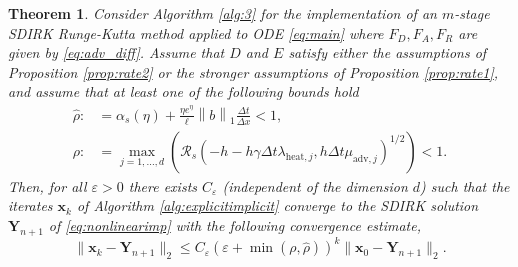 \documentclass[10pt,a4paper]{article}
\newtheorem{theorem}{Theorem}[section]
\renewcommand{\epsilon}{\varepsilon}
\newcommand{\norm}[1]{\left\lVert #1 \right\rVert}
\begin{document}
\begin{theorem}\label{thm:ad}
Consider Algorithm \ref{alg:3} for the implementation of an $m$-stage SDIRK Runge-Kutta method applied to ODE \eqref{eq:main} where $F_{D},F_{A},F_{R}$ are given by \eqref{eq:adv_diff}. Assume that $D$ and $E$ satisfy either the assumptions of Proposition \ref{prop:rate2} or the stronger assumptions of Proposition \ref{prop:rate1}, and
{assume that at least one of the following bounds hold}
{\begin{align*}
\hat \rho:&= \alpha_s(\eta)+ \frac{\eta e^\eta}{\ell}\norm{b}_{1}\frac{\Delta t}{\Delta x}<1,
 \\
\rho:&= \max_{j=1,\ldots,d} \left(\mathcal{R}_s(-h-h\gamma\Delta t \lambda_{\text{heat},j},h\Delta t \mu_{\text{adv},j})^{1/2}\right)<1.
\end{align*}}
Then, for all $\varepsilon>0$ there exists $C_\varepsilon$ (independent of the dimension $d$)  such that the iterates $\boldsymbol{x}_k$ of Algorithm \ref{alg:explicitimplicit} converge to the
SDIRK solution $\boldsymbol{Y}_{n+1}$ of \eqref{eq:nonlinearimp} with the following convergence estimate,
    \begin{equation} \label{eq:boundadv}
\|\boldsymbol{x}_k-\boldsymbol{Y}_{n+1}\|_2 \leq C_\varepsilon
\left(\varepsilon+ \min(\rho,\hat \rho)
\right)^k \|\boldsymbol{x}_0-\boldsymbol{Y}_{n+1}\|_2.
\end{equation} 
\end{theorem}
\end{document}
